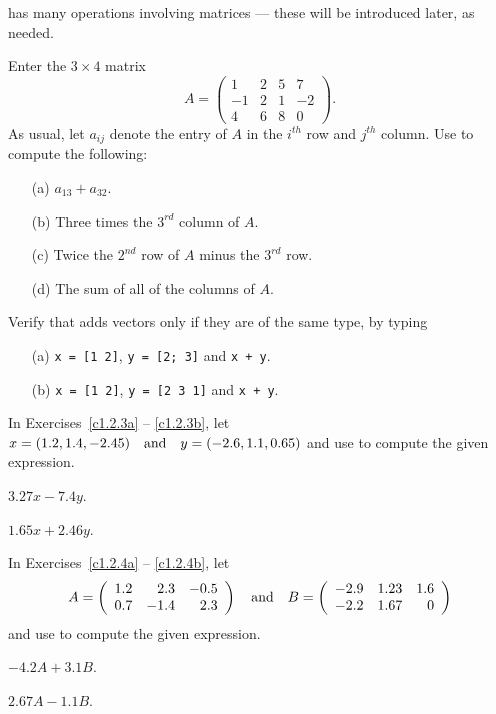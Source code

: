 \documentclass{ximera}
\begin{document}
\Matlab has many operations involving matrices --- these will
be introduced later, as needed.

\EXER

\CEXER

\begin{exercise}  \label{c1.2.1}
Enter the $3\times 4$ matrix
\[
A = \left(\begin{array}{rrrr} 1 & 2 & 5 & 7 \\ -1 & 2 & 1 & -2
\\ 4 & 6 & 8 & 0 \end{array}\right).
\]
As usual, let $a_{ij}$ denote the entry of $A$ in the $i^{th}$
row and $j^{th}$ column.  Use \Matlab to compute the following:
\begin{enumerate}
\item[(a)] $a_{13} + a_{32}$.
\item[(b)] Three times the $3^{rd}$ column of $A$.
\item[(c)] Twice the $2^{nd}$ row of $A$ minus the $3^{rd}$ row.
\item[(d)] The sum of all of the columns of $A$.
\end{enumerate}
\end{exercise}

\begin{exercise}  \label{c1.2.2}
Verify that \Matlab adds vectors only if they are of the same type, by typing
\begin{enumerate}
\item[(a)]  {\tt x = [1 2]}, {\tt y = [2; 3]} and {\tt x + y}.
\item[(b)]  {\tt x = [1 2]}, {\tt y = [2 3 1]} and {\tt x + y}.
\end{enumerate}
\end{exercise}

\noindent In Exercises~\ref{c1.2.3a} -- \ref{c1.2.3b}, let 
$x=(1.2,1.4,-2.45) \quad\mbox{and}\quad y=(-2.6,1.1,0.65)$ and use \Matlab to compute the 
given expression.
\begin{exercise}  \label{c1.2.3a}
$3.27x-7.4y$.
\end{exercise}
\begin{exercise}  \label{c1.2.3b}
$1.65x+2.46y$.
\end{exercise}

\noindent In Exercises~\ref{c1.2.4a} -- \ref{c1.2.4b}, let 
\[
A = \left(\begin{array}{rrr} 1.2 & 2.3 & -0.5\\ 0.7 & -1.4 & 2.3
\end{array}\right) \quad\mbox{and}\quad
B = \left(\begin{array}{rrr} -2.9 & 1.23 & 1.6\\ -2.2 & 1.67 & 0
\end{array}\right)
\]
and use \Matlab to compute the given expression.
\begin{exercise}  \label{c1.2.4a}
$-4.2A+3.1B$.
\end{exercise}
\begin{exercise}  \label{c1.2.4b}
$2.67A-1.1B$.
\end{exercise}
\end{document}
